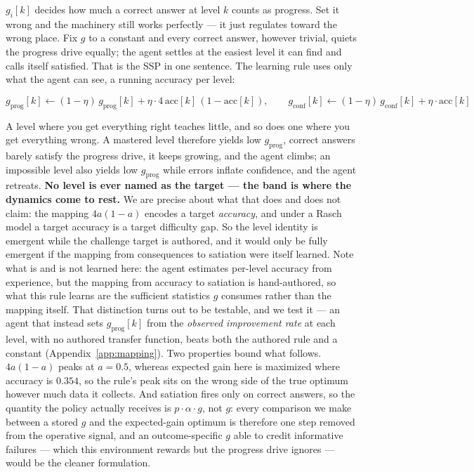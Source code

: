 \documentclass{article}
\begin{document}
$g_i[k]$ decides how much a correct answer at level $k$ counts as progress. Set it wrong and the machinery still works perfectly --- it just regulates toward the wrong place. Fix $g$ to a constant and every correct answer, however trivial, quiets the progress drive equally; the agent settles at the easiest level it can find and calls itself satisfied. That is the SSP in one sentence. The learning rule uses only what the agent can see, a running accuracy per level:

\begin{equation}
g_{\text{prog}}[k] \leftarrow (1-\eta)\, g_{\text{prog}}[k] + \eta \cdot 4\,\text{acc}[k]\,(1 - \text{acc}[k]), \qquad
g_{\text{conf}}[k] \leftarrow (1-\eta)\, g_{\text{conf}}[k] + \eta \cdot \text{acc}[k]
\end{equation}

A level where you get everything right teaches little, and so does one where you get everything wrong. A mastered level therefore yields low $g_{\text{prog}}$, correct answers barely satisfy the progress drive, it keeps growing, and the agent climbs; an impossible level also yields low $g_{\text{prog}}$ while errors inflate confidence, and the agent retreats. \textbf{No level is ever named as the target --- the band is where the dynamics come to rest.} We are precise about what that does and does not claim: the mapping $4a(1-a)$ encodes a target \emph{accuracy}, and under a Rasch model a target accuracy is a target difficulty gap. So the level identity is emergent while the challenge target is authored, and it would only be fully emergent if the mapping from consequences to satiation were itself learned. Note what is and is not learned here: the agent estimates per-level accuracy from experience, but the mapping from accuracy to satiation is hand-authored, so what this rule learns are the sufficient statistics $g$ consumes rather than the mapping itself. That distinction turns out to be testable, and we test it --- an agent that instead sets $g_{\text{prog}}[k]$ from the \emph{observed improvement rate} at each level, with no authored transfer function, beats both the authored rule and a constant (Appendix~\ref{app:mapping}). Two properties bound what follows. $4a(1-a)$ peaks at $a{=}0.5$, whereas expected gain here is maximized where accuracy is $0.354$, so the rule's peak sits on the wrong side of the true optimum however much data it collects. And satiation fires only on correct answers, so the quantity the policy actually receives is $p\cdot\alpha\cdot g$, not $g$: every comparison we make between a stored $g$ and the expected-gain optimum is therefore one step removed from the operative signal, and an outcome-specific $g$ able to credit informative failures --- which this environment rewards but the progress drive ignores --- would be the cleaner formulation.
\end{document}
